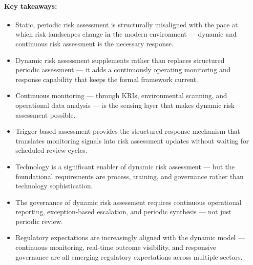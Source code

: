 \paragraph{Key takeaways:}
\begin{itemize}
  \item{Static, periodic risk assessment is structurally misaligned with the pace at which risk landscapes change in the modern environment — dynamic and continuous risk assessment is the necessary response.}
  \item{Dynamic risk assessment supplements rather than replaces structured periodic assessment — it adds a continuously operating monitoring and response capability that keeps the formal framework current.}
  \item{Continuous monitoring — through KRIs, environmental scanning, and operational data analysis — is the sensing layer that makes dynamic risk assessment possible.}
  \item{Trigger-based assessment provides the structured response mechanism that translates monitoring signals into risk assessment updates without waiting for scheduled review cycles.}
  \item{Technology is a significant enabler of dynamic risk assessment — but the foundational requirements are process, training, and governance rather than technology sophistication.}
  \item{The governance of dynamic risk assessment requires continuous operational reporting, exception-based escalation, and periodic synthesis — not just periodic review.}
  \item{Regulatory expectations are increasingly aligned with the dynamic model — continuous monitoring, real-time outcome visibility, and responsive governance are all emerging regulatory expectations across multiple sectors.}
\end{itemize}

